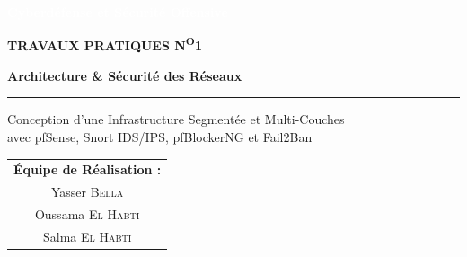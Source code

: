 \documentclass[12pt,a4paper,openany]{report}
\begin{document}
	\sloppy
	
	\begin{titlepage}
		\thispagestyle{empty}
		
		\noindent
		\colorbox{primary}{%
			\parbox{\dimexpr\textwidth-2\fboxsep}{%
				\vspace{0.6cm}
				\centering
				{\large\bfseries\textcolor{white}{Cyberdéfense et Sécurité Offensive}}\\[0.6cm]
			}%
		}
		
		\vspace{1.5cm}
		\centering
		
		{\normalsize\bfseries\color{black!40}\MakeUppercase{Travaux Pratiques N\textsuperscript{o}1}}
		
		\vspace{0.8cm}
		
		{\Huge\bfseries\color{primary}
			Architecture \& Sécurité des Réseaux\par
		}
		
		\vspace{0.5cm}
		
		{\color{accent}\rule{7cm}{1.5pt}\par}
		
		\vspace{0.5cm}
		
		{\large\color{black!60}
			Conception d'une Infrastructure Segmentée et Multi-Couches\\[0.2cm]
			avec pfSense, Snort IDS/IPS, pfBlockerNG et Fail2Ban\par
		}
		
		\vspace{2cm}
		
		{\large
			\renewcommand{\arraystretch}{1.5}
			\begin{tabular}{c}
				\textbf{\color{primary}Équipe de Réalisation :}\\[0.3cm]
				Yasser \textsc{Bella} \\
				Oussama \textsc{El Habti} \\
				Salma \textsc{El Habti} \\[0.6cm]
				

\end{tabular}}
\end{titlepage}
\end{document}
